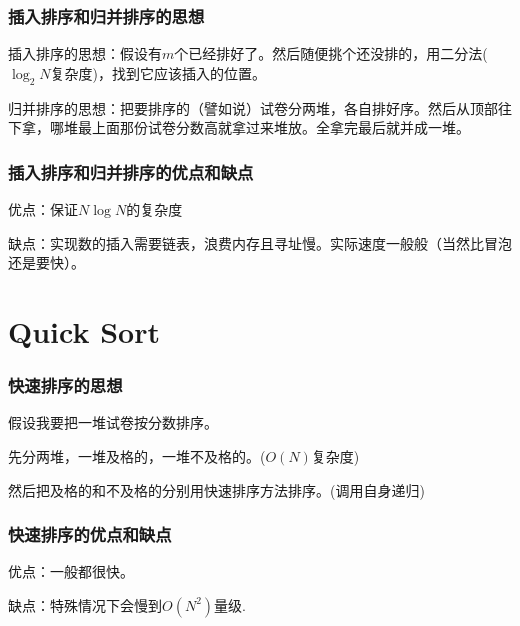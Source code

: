 \documentclass[CJK,14pt]{beamer}
\begin{document}
  \begin{frame}
    \frametitle{插入排序和归并排序的思想}
    插入排序的思想：假设有$m$个已经排好了。然后随便挑个还没排的，用二分法($\log_2N$复杂度)，找到它应该插入的位置。

    归并排序的思想：把要排序的（譬如说）试卷分两堆，各自排好序。然后从顶部往下拿，哪堆最上面那份试卷分数高就拿过来堆放。全拿完最后就并成一堆。
  \end{frame}


      \begin{frame}
    \frametitle{插入排序和归并排序的优点和缺点}
    \bitem
  \item{优点：保证$N\log N$的复杂度}
  \item{缺点：实现数的插入需要链表，浪费内存且寻址慢。实际速度一般般（当然比冒泡还是要快）。}    
    \eitem
  \end{frame}



  \section{Quick Sort}

  \begin{frame}
    \frametitle{快速排序的思想}
    假设我要把一堆试卷按分数排序。
    
    先分两堆，一堆及格的，一堆不及格的。($O(N)$复杂度)

    然后把及格的和不及格的分别用快速排序方法排序。(调用自身递归)
  \end{frame}
  
\begin{frame}
  \frametitle{快速排序的优点和缺点}
    \bitem
  \item{优点：一般都很快。}
  \item{缺点：特殊情况下会慢到$O(N^2)$量级.}
    \eitem
  \end{frame}
  
\ech
\end{document}
